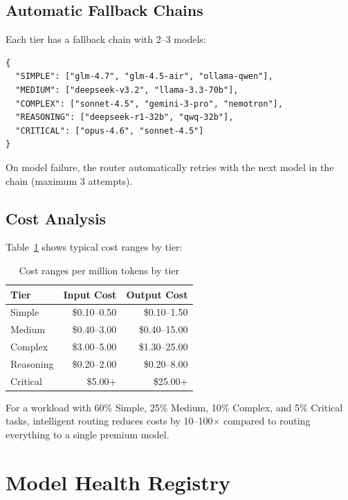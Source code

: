 \documentclass{article}
\begin{document}
\subsection{Automatic Fallback Chains}

Each tier has a fallback chain with 2--3 models:

\begin{lstlisting}[style=jsoncode]
{
  "SIMPLE": ["glm-4.7", "glm-4.5-air", "ollama-qwen"],
  "MEDIUM": ["deepseek-v3.2", "llama-3.3-70b"],
  "COMPLEX": ["sonnet-4.5", "gemini-3-pro", "nemotron"],
  "REASONING": ["deepseek-r1-32b", "qwq-32b"],
  "CRITICAL": ["opus-4.6", "sonnet-4.5"]
}
\end{lstlisting}

On model failure, the router automatically retries with the next model in the chain (maximum 3 attempts).

\subsection{Cost Analysis}

Table~\ref{tab:cost} shows typical cost ranges by tier:

\begin{table}[h]
\centering
\caption{Cost ranges per million tokens by tier}
\label{tab:cost}
\begin{tabular}{lrr}
\toprule
\textbf{Tier} & \textbf{Input Cost} & \textbf{Output Cost} \\
\midrule
Simple & \$0.10--0.50 & \$0.10--1.50 \\
Medium & \$0.40--3.00 & \$0.40--15.00 \\
Complex & \$3.00--5.00 & \$1.30--25.00 \\
Reasoning & \$0.20--2.00 & \$0.20--8.00 \\
Critical & \$5.00+ & \$25.00+ \\
\bottomrule
\end{tabular}
\end{table}

For a workload with 60\% Simple, 25\% Medium, 10\% Complex, and 5\% Critical tasks, intelligent routing reduces costs by 10--100$\times$ compared to routing everything to a single premium model.



\section{Model Health Registry}
\label{sec:health}
\end{document}

